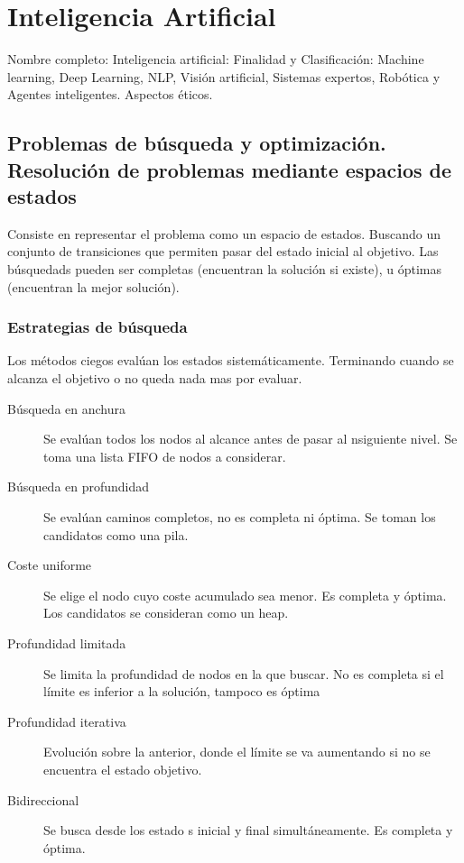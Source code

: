 \setcounter{section}{69}
\section{Inteligencia Artificial}

Nombre completo: Inteligencia artificial: Finalidad y Clasificación: Machine learning, Deep Learning, NLP, Visión artificial, Sistemas expertos, Robótica y Agentes inteligentes. Aspectos éticos.

\localtableofcontents

\subsection{Problemas de búsqueda y optimización. Resolución de problemas mediante espacios de estados}
    Consiste en representar el problema como un espacio de estados. Buscando un conjunto de transiciones que permiten pasar del estado inicial al objetivo. Las búsquedads pueden ser completas (encuentran la solución si existe), u óptimas (encuentran la mejor solución).

    \subsubsection{Estrategias de búsqueda}
        Los métodos ciegos evalúan los estados sistemáticamente. Terminando cuando se alcanza el objetivo o no queda nada mas por evaluar.
        \begin{description}
            \item[Búsqueda en anchura] Se evalúan todos los nodos al alcance antes de pasar al nsiguiente nivel. Se toma una lista FIFO de nodos a considerar.
            \item[Búsqueda en profundidad] Se evalúan caminos completos, no es completa ni óptima. Se toman los candidatos como una pila.
            \item[Coste uniforme] Se elige el nodo cuyo coste acumulado sea menor. Es completa y óptima. Los candidatos se consideran como un heap.
            \item[Profundidad limitada] Se limita la profundidad de nodos en la que buscar. No es completa si el límite es inferior a la solución, tampoco es óptima
            \item[Profundidad iterativa] Evolución sobre la anterior, donde el límite se va aumentando si no se encuentra el estado objetivo.
            \item[Bidireccional] Se busca desde los estado s inicial y final simultáneamente. Es completa y óptima.
        \end{description}

